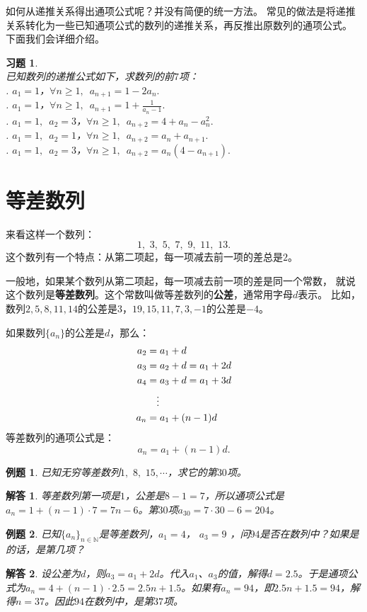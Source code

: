 \documentclass[12pt,UTF8]{ctexbook}
\newtheorem{et}{例题}[section]
\newtheorem*{so}{解答}
\newtheorem{xt}{习题}[section]
\begin{document}
如何从递推关系得出通项公式呢？并没有简便的统一方法。
常见的做法是将递推关系转化为一些已知通项公式的数列的递推关系，再反推出原数列的通项公式。
下面我们会详细介绍。

\begin{xt}
\mbox{}\\
已知数列的递推公式如下，求数列的前$7$项：\\
. $a_1 = 1$，$\forall n \geqslant 1, \,\,\, a_{n+1} = 1 - 2a_n.$\\
. $a_1 = 1$，$\forall n \geqslant 1, \,\,\, a_{n+1} = 1 + \frac{1}{a_n - 1}.$\\
. $a_1 = 1, \,\, \, a_2 = 3$，$\forall n \geqslant 1, \,\,\, a_{n+2} = 4 + a_n - a_n^2.$\\
. $a_1 = 1, \,\, \, a_2 = 1$，$\forall n \geqslant 1, \,\,\, a_{n+2} = a_n +a_{n+1}.$\\
. $a_1 = 1, \,\, \, a_2 = 3$，$\forall n \geqslant 1, \,\,\, a_{n+2} = a_n(4 - a_{n+1}).$
\end{xt}

\section{等差数列}
来看这样一个数列：
$$ 1,\,\,3,\,\,5,\,\,7,\,\,9,\,\,11,\,\, 13. $$
这个数列有一个特点：从第二项起，每一项减去前一项的差总是$2$。

一般地，如果某个数列从第二项起，每一项减去前一项的差是同一个常数，
就说这个数列是\textbf{等差数列}。这个常数叫做等差数列的\textbf{公差}，通常用字母$d$表示。
比如，数列$2,5,8,11,14$的公差是$3$，$19,15,11,7,3,-1$的公差是$-4$。

如果数列$\{a_n\}$的公差是$d$，那么：
\begin{align}
a_2 &= a_1 + d \notag \\
a_3 &= a_2 + d = a_1 + 2d \notag \\
a_4 &= a_3 + d = a_1 + 3d \notag \\
&\quad \vdots \notag \\
a_n &= a_1 + (n-1)d \notag 
\end{align}
等差数列的通项公式是：
$$a_n = a_1 + (n-1)d.$$
\begin{et}
已知无穷等差数列$1,\,\,8,\,\,15, \cdots$，求它的第$30$项。
\end{et}
\begin{so}
等差数列第一项是$1$，公差是$8-1=7$，所以通项公式是$a_n = 1 + (n-1)\cdot 7 = 7n - 6$。第$30$项$a_{30} = 7\cdot 30 - 6 = 204$。
\end{so}
\begin{et}
已知$\{a_n\}_{n\in\mathbb{N}}$是等差数列，$a_1 = 4$， $a_3 = 9$ ，问$94$是否在数列中？如果是的话，是第几项？
\end{et}
\begin{so}
设公差为$d$，则$a_3 = a_1 + 2d$。代入$a_1$、$a_3$的值，解得$d = 2.5$。于是通项公式为$a_n = 4 + (n-1)\cdot 2.5 = 2.5n + 1.5$。如果有$a_n = 94$，即$2.5n + 1.5=94$，解得$n = 37$。因此$94$在数列中，是第$37$项。
\end{so}
\end{document}
